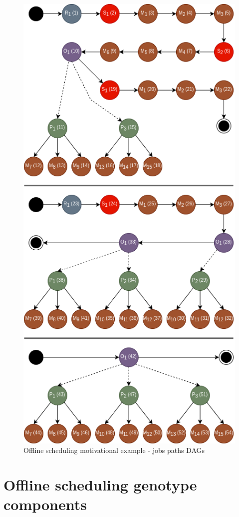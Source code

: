 \begin{figure}[!htbp]
	\centering
	\includegraphics[scale=0.6]{../images/offline_scheduling_jobs.png}
	\caption{Offline scheduling motivational example - jobs paths DAGs}
    \label{fig:offline_scheduling_jobs}
\end{figure}

\section{Offline scheduling genotype components}
\label{sec:offline_scheduling_genotype_components}

